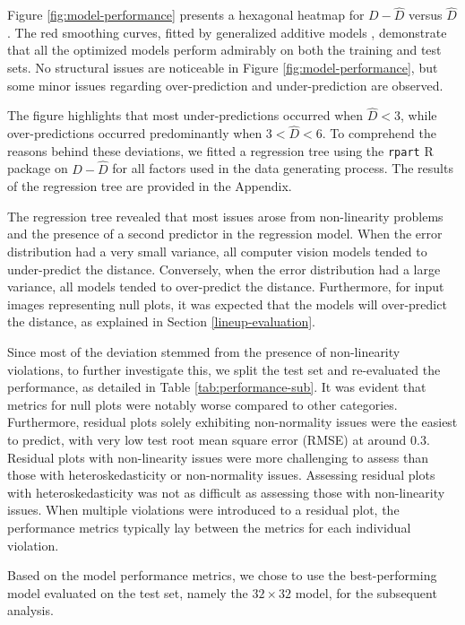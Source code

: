 \documentclass[]{interact}
\theoremstyle{plain}%
\theoremstyle{definition}
\theoremstyle{remark}
\begin{document}
Figure \ref{fig:model-performance} presents a hexagonal heatmap for
\(D - \hat{D}\) versus \(\hat{D}\). The red smoothing curves, fitted by
generalized additive models \citep{hastie2017generalized}, demonstrate
that all the optimized models perform admirably on both the training and
test sets. No structural issues are noticeable in Figure
\ref{fig:model-performance}, but some minor issues regarding
over-prediction and under-prediction are observed.

The figure highlights that most under-predictions occurred when
\(\hat{D} < 3\), while over-predictions occurred predominantly when
\(3 < \hat{D} < 6\). To comprehend the reasons behind these deviations,
we fitted a regression tree using the \texttt{rpart} R package
\citep{Terry2022rpart} on \(D - \hat{D}\) for all factors used in the
data generating process. The results of the regression tree are provided
in the Appendix.

The regression tree revealed that most issues arose from non-linearity
problems and the presence of a second predictor in the regression model.
When the error distribution had a very small variance, all computer
vision models tended to under-predict the distance. Conversely, when the
error distribution had a large variance, all models tended to
over-predict the distance. Furthermore, for input images representing
null plots, it was expected that the models will over-predict the
distance, as explained in Section \ref{lineup-evaluation}.

Since most of the deviation stemmed from the presence of non-linearity
violations, to further investigate this, we split the test set and
re-evaluated the performance, as detailed in Table
\ref{tab:performance-sub}. It was evident that metrics for null plots
were notably worse compared to other categories. Furthermore, residual
plots solely exhibiting non-normality issues were the easiest to
predict, with very low test root mean square error (RMSE) at around
\(0.3\). Residual plots with non-linearity issues were more challenging
to assess than those with heteroskedasticity or non-normality issues.
Assessing residual plots with heteroskedasticity was not as difficult as
assessing those with non-linearity issues. When multiple violations were
introduced to a residual plot, the performance metrics typically lay
between the metrics for each individual violation.

Based on the model performance metrics, we chose to use the
best-performing model evaluated on the test set, namely the
\(32 \times 32\) model, for the subsequent analysis.
\end{document}
